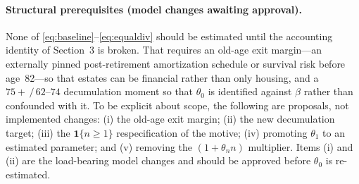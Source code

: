 \documentclass[10pt]{article}
\newcommand{\one}{\mathbf{1}}
\begin{document}
\paragraph{Structural prerequisites (model changes awaiting approval).} None of
\eqref{eq:baseline}--\eqref{eq:equaldiv} should be estimated until the
accounting identity of Section~3 is broken. That requires an old-age exit
margin---an externally pinned post-retirement amortization schedule or survival
risk before age~82---so that estates can be financial rather than only
housing, and a $75+\,/\,62\text{--}74$ decumulation moment so that $\theta_0$ is
identified against $\beta$ rather than confounded with it. To be explicit about
scope, the following are proposals, not implemented changes: (i) the old-age
exit margin; (ii) the new decumulation target; (iii) the $\one\{n\ge1\}$
respecification of the motive; (iv) promoting $\theta_1$ to an estimated
parameter; and (v) removing the $(1+\theta_n n)$ multiplier. Items (i) and (ii)
are the load-bearing model changes and should be approved before $\theta_0$ is
re-estimated.
\end{document}
